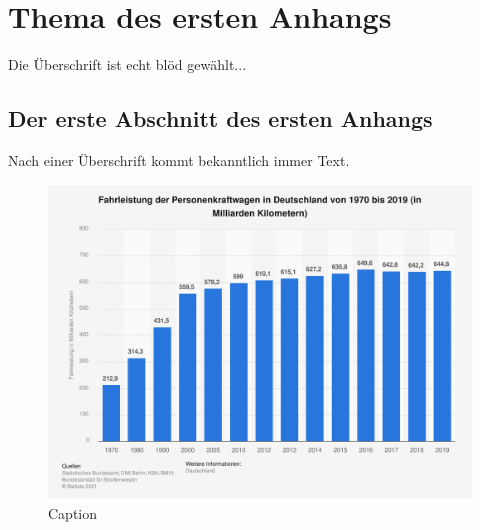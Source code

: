 \chapter{Thema des ersten Anhangs}
\label{sec:ThemaDesErstenAnhangs}
Die Überschrift ist echt blöd gewählt...
\section{Der erste Abschnitt des ersten Anhangs}
Nach einer Überschrift kommt bekanntlich immer Text.

\begin{figure}
    \centering
    \includegraphics[width=1\linewidth]{bilder/statistic_id2984_fahrleistung-von-pkw-in-deutschland-bis-2019.pdf}
    \caption{Caption}
    \label{fig:my_label_im_anhang}
\end{figure}

